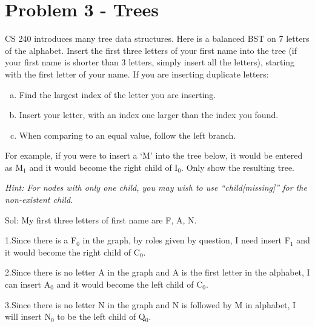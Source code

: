 \documentclass[12pt]{article}
\begin{document}
\section*{Problem 3 - Trees}
CS 240 introduces many tree data structures. Here is a balanced BST on 7 letters of the 
alphabet. Insert the first three letters of your first name into the tree (if your first 
name is shorter than 3 letters, simply insert all the letters), starting 
with the first letter of your name. If you are inserting duplicate
letters:

\begin{enumerate}[a)]
	\item Find the largest index of the letter you are inserting. 
	\item Insert your letter, with an index one larger than the index you found.
	\item When comparing to an equal value, follow the left branch.

\end{enumerate}

For example, if you were to insert a `M' into the tree below, it would be entered as M$_1$ and it would become the right child of I$_0$. Only show the resulting tree.

\begin{center}\end{center}

{\it Hint: For nodes with only one child, you may wish to use ``child[missing]'' for the non-existent child.}

Sol:
My first three letters of first name are F, A, N.

1.Since there is a F$_0$ in the graph, by roles given by question, I need insert F$_1$ and it would become the right child of C$_0$.

2.Since there is no letter A in the graph and A is the first letter in the alphabet, I can insert A$_0$ and it would become the left child of C$_0$. 

3.Since there is no letter N in the graph and N is followed by M in alphabet, I will insert N$_0$ to be the left child of Q$_0$. 
\end{document}
